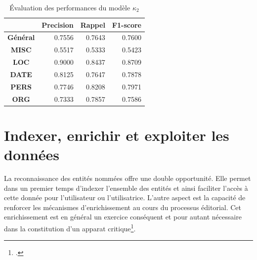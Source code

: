     \begin{table}[H]
    \centering
    \begin{tabular}{c|r|r|r|}
    \cline{2-4}
    \textbf{}                              & \multicolumn{1}{c|}{\textbf{Precision}} & \multicolumn{1}{c|}{\textbf{Rappel}} & \multicolumn{1}{c|}{\textbf{F1-score}} \\ \hline
    \multicolumn{1}{|c|}{\textbf{Général}} & 0.7556                                  & 0.7643                               & 0.7600                                 \\ \hline
    \multicolumn{1}{|c|}{\textbf{MISC}}    & 0.5517                                  & 0.5333                               & 0.5423                                 \\ \hline
    \multicolumn{1}{|c|}{\textbf{LOC}}     & 0.9000                                  & 0.8437                               & 0.8709                                 \\ \hline
    \multicolumn{1}{|c|}{\textbf{DATE}}    & 0.8125                                  & 0.7647                               & 0.7878                                 \\ \hline
    \multicolumn{1}{|c|}{\textbf{PERS}}    & 0.7746                                  & 0.8208                               & 0.7971                                 \\ \hline
    \multicolumn{1}{|c|}{\textbf{ORG}}     & 0.7333                                  & 0.7857                               & 0.7586                                 \\ \hline
    \end{tabular}
    \caption{Évaluation des performances du modèle $\kappa_2$}
    \label{tab:k2_benchmark}
    \end{table}
	
	
	\section{Indexer, enrichir et exploiter les données}
	
	La reconnaissance des entités nommées offre une double opportunité. Elle permet dans un premier temps d'indexer l'ensemble des entités et ainsi faciliter l'accès à cette donnée pour l'utilisateur ou l'utilisatrice. L'autre aspect est la capacité de renforcer les mécanismes d'enrichissement au cours du processus éditorial. Cet enrichissement est en général un exercice conséquent et pour autant nécessaire dans la constitution d'un apparat critique\footcite{campsOuVaPhilologie2018}.
	 
